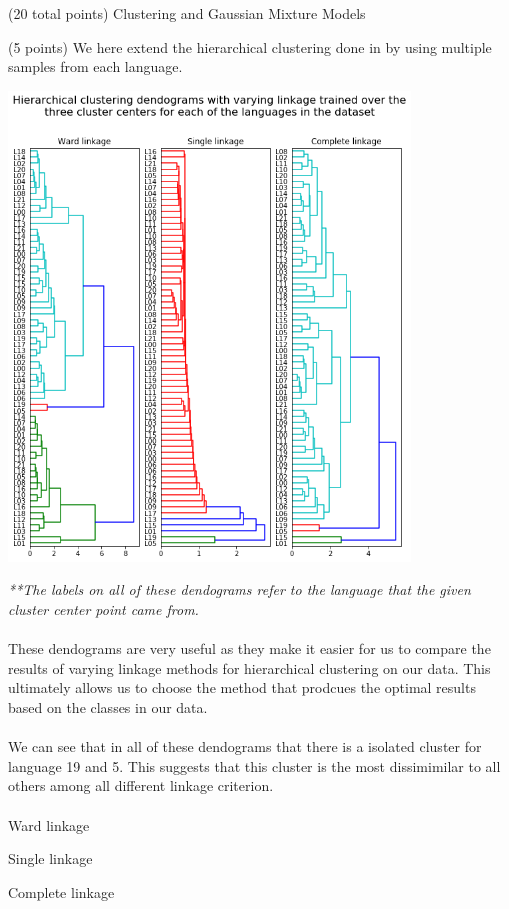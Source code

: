 \documentclass[12pt]{article}
\begin{document}
\begin{question}{(20 total points) Clustering and Gaussian Mixture Models}
\begin{subquestion}{(5 points)
       We here extend the hierarchical clustering done in  by
       using multiple samples from each language.
     }
   

      \begin{answerbox}{52em}
        \begin{center}
        \includegraphics[width=0.8\textwidth]{images/q34.png}
        \end{center}
        \footnotesize{
        \emph{**The labels on all of these dendograms refer to the language that the given cluster center point came from.}\\
\\
        These dendograms are very useful as they make it easier for us to compare the results of varying linkage methods for hierarchical clustering on our data. This ultimately allows us to choose the method that prodcues the optimal results based on the classes in our data.\\
\\
        We can see that in all of these dendograms that there is a isolated cluster for language 19 and 5. This suggests that this cluster is the most dissimimilar to all others among all different linkage criterion.\\
\\        
        Ward linkage

        Single linkage

        Complete linkage
        } 
      \end{answerbox}
  



\end{subquestion}
\end{question}
\end{document}
